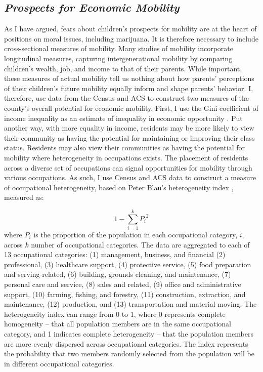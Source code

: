%

\subsection{\it{Prospects for Economic Mobility}}

As I have argued, fears about children's prospects for mobility are at the heart of positions on moral issues, including marijuana. It is therefore necessary to include cross-sectional measures of mobility. Many studies of mobility incorporate longitudinal measures, capturing intergenerational mobility by comparing children's wealth, job, and income to that of their parents. While important, these measures of actual mobility tell us nothing about how parents' perceptions of their children's future mobility equally inform and shape parents' behavior. I, therefore, use data from the Census and ACS to construct two measures of the county's overall potential for economic mobility. First, I use the Gini coefficient of income inequality as an estimate of inequality in economic opportunity \citep{corak_2013,kuznets_1955}. Put another way, with more equality in income, residents may be more likely to view their community as having the potential for maintaining or improving their class status. Residents may also view their communities as having the potential for mobility where heterogeneity in occupations exists. The placement of residents across a diverse set of occupations can signal opportunities for mobility through various occupations. As such, I use Census and ACS data to construct a measure of occupational heterogeneity, based on Peter Blau's heterogeneity index \citep{blau_1977a}, measured as:

\begin{equation}
1 - \sum_{i = 1}^{k}{P_{i}}^2
\end{equation}
where $P_{i}$ is the proportion of the population in each occupational category, $i$, across $k$ number of occupational categories. The data are aggregated to each of 13 occupational categories: (1) management, business, and financial (2) professional, (3) healthcare support, (4) protective service, (5) food preparation and serving-related, (6) building, grounds cleaning, and maintenance, (7) personal care and service, (8) sales and related, (9) office and administrative support, (10) farming, fishing, and forestry, (11) construction, extraction, and maintenance, (12) production, and (13) transportation and material moving. The heterogeneity index can range from 0 to 1, where 0 represents complete homogeneity -- that all population members are in the same occupational category, and 1 indicates complete heterogeneity -- that the population members are more evenly dispersed across occupational categories. The index represents the probability that two members randomly selected from the population will be in different occupational categories.


